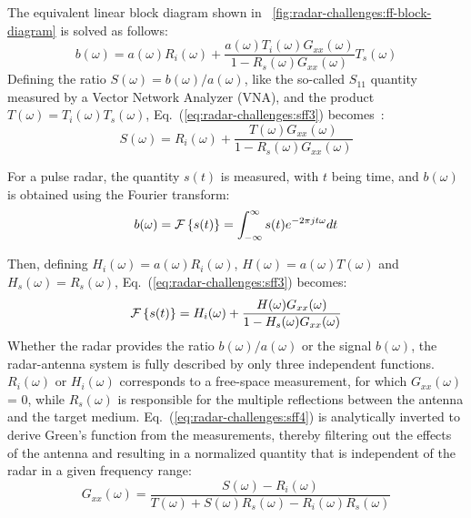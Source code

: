The equivalent linear block diagram shown in \fig~\ref{fig:radar-challenges:ff-block-diagram} is solved as follows:
\begin{equation}\label{eq:radar-challenges:sff3}
b(\omega) = a(\omega) R_{i}(\omega) + \frac{a(\omega) T_{i}(\omega) G_{xx}(\omega)}{1- R_{s}(\omega) G_{xx}(\omega)} T_{s}(\omega)
\end{equation}
Defining the ratio $S(\omega) = b(\omega)/a(\omega)$, like the so-called $S_{11}$ quantity measured by a Vector Network Analyzer (VNA), and the product $T(\omega) = T_{i}(\omega)T_{s}(\omega)$, Eq.~(\ref{eq:radar-challenges:sff3}) becomes~\cite{Lambot:2004}:
\begin{equation}\label{eq:radar-challenges:sff4}
S(\omega) = R_{i}(\omega) + \frac{T(\omega) G_{xx}(\omega)}{1- R_{s}(\omega) G_{xx}(\omega)}
\end{equation}

For a pulse radar, the quantity $s(t)$ is measured, with $t$ being time, and $b(\omega)$ is obtained using the Fourier transform:
\begin{equation}
\label{eq:radar-challenges:fft}
b(\omega)=\text{$\cal{F}$}\left\{
s(t)
\right\}=\int_{-\infty}^{\infty}s(t)e^{-2\pi j t \omega}dt
\end{equation}

Then, defining $H_i(\omega)=a(\omega) R_{i}(\omega)$, $H(\omega) = a(\omega) T(\omega)$ and $H_s(\omega) = R_{s}(\omega)$, Eq.~(\ref{eq:radar-challenges:sff3}) becomes:
\begin{equation}\label{eq:radar-challenges:sff5}
\text{$\cal{F}$}\left\{
s(t)
\right\} = H_{i}(\omega) + \frac{ H(\omega) G_{xx}(\omega)}{1- H_{s}(\omega) G_{xx}(\omega)}
\end{equation}
Whether the radar provides the ratio $b(\omega)/a(\omega)$ or the signal $b(\omega)$, the radar-antenna system is fully described by only three independent functions.
$R_i(\omega)$ or $H_i(\omega)$ corresponds to a free-space measurement, for which $G_{xx}(\omega)$ = 0, while $R_{s}(\omega)$ is responsible for the multiple reflections between the antenna and the target medium. Eq.~(\ref{eq:radar-challenges:sff4}) is analytically inverted to derive Green's function from the measurements, thereby filtering out the effects of the antenna and resulting in a normalized quantity that is independent of the radar in a given frequency range:
\begin{equation}\label{eq:radar-challenges:sff6}
G_{xx}(\omega) = \frac{S(\omega) -  R_{i}(\omega)}{T(\omega) + S(\omega)R_{s}(\omega) - R_{i}(\omega)R_{s}(\omega)}
\end{equation}

